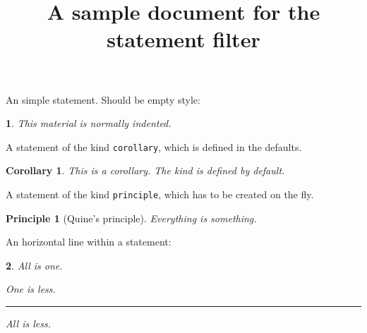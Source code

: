 \documentclass[
]{article}
\title{A sample document for the statement filter}
\author{}
\date{}
\theoremstyle{empty}
\newtheorem{statement}{}
\theoremstyle{plain}
\newtheorem{corollary}{Corollary}
\theoremstyle{plain}
\newtheorem{principle}{Principle}
\begin{document}
\maketitle

An simple statement. Should be empty style:

\begin{statement}

This material is normally indented.

\end{statement}

A statement of the kind \texttt{corollary}, which is defined in the
defaults.

\begin{corollary}

This is a corollary. The kind is defined by default.

\end{corollary}

A statement of the kind \texttt{principle}, which has to be created on
the fly.

\begin{principle}[Quine’s principle]

Everything is something.

\end{principle}

An horizontal line within a statement:

\begin{statement}

All is one.

One is less.

\rule{0.5\linewidth}{0.5pt}

All is less.

\end{statement}
\end{document}
